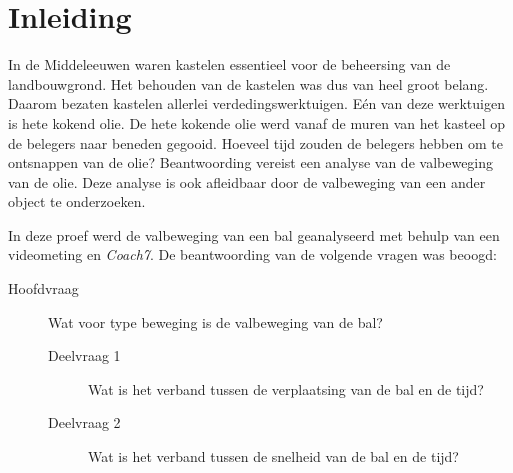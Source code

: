 \documentclass{scrartcl}
\begin{document}

%
\tableofcontents
\newpage
\section*{Inleiding}\label{sec:Inleiding}
In de Middeleeuwen waren kastelen essentieel voor de beheersing van de landbouwgrond. Het behouden van de kastelen was dus van heel groot belang. Daarom bezaten kastelen allerlei verdedingswerktuigen. E\'{e}n van deze werktuigen is hete kokend olie. De hete kokende olie werd vanaf de muren van het kasteel op de belegers naar beneden gegooid. Hoeveel tijd zouden de belegers hebben om te ontsnappen van de olie? Beantwoording vereist een analyse van de valbeweging van de olie. Deze analyse is ook afleidbaar door de valbeweging van een ander object te onderzoeken.
\par
In deze proef werd de valbeweging van een bal geanalyseerd met behulp van een videometing en \textit{Coach7}. De beantwoording van de volgende vragen was beoogd:
\begin{description}
\item[Hoofdvraag] Wat voor type beweging is de valbeweging van de bal?
\begin{description}
\item[Deelvraag 1] Wat is het verband tussen de verplaatsing van de bal en de tijd?
\item[Deelvraag 2] Wat is het verband tussen de snelheid van de bal en de tijd?
\end{description}
\end{description}
%
\end{document}
